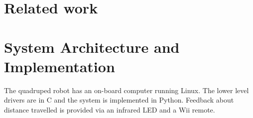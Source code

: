 \section{Related work}




\section{System Architecture and Implementation}

The quadruped robot has an on-board computer running Linux. The lower
level drivers are in C and the system is implemented in Python. Feedback about distance travelled is provided via an infrared LED and a Wii remote. 

